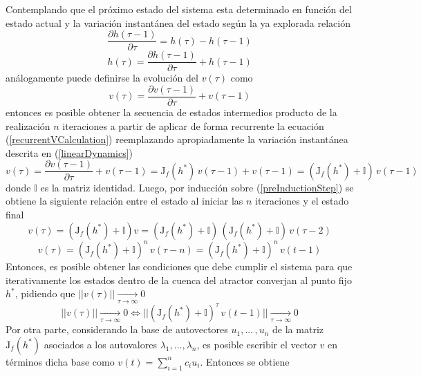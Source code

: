 \documentclass{article}
\begin{document}
	Contemplando que el próximo estado del sistema esta determinado en función del estado actual y la variación instantánea del estado según la ya explorada relación
	\begin{equation*}
	\dfrac{\partial h(\tau -1)}{\partial \tau} = h(\tau) - h(\tau -1)
	\end{equation*}
	\begin{equation}\label{recurrentStateCalculation}
	h(\tau) = \dfrac{\partial h(\tau -1)}{\partial \tau} + h(\tau -1)
	\end{equation}
	análogamente puede definirse la evolución del $v(\tau)$ como 
	\begin{equation}\label{recurrentVCalculation}
	v(\tau) = \dfrac{\partial v(\tau -1)}{\partial \tau} + v(\tau -1)
	\end{equation}
	entonces es posible obtener la secuencia de estados intermedios producto de la realización $n$ iteraciones a partir de aplicar de forma recurrente la ecuación (\ref{recurrentVCalculation}) reemplazando apropiadamente la variación instantánea descrita en (\ref{linearDynamics})
	\begin{equation}\label{preInductionStep}
	v(\tau) = \dfrac{\partial v(\tau -1)}{\partial \tau} + v(\tau -1) = \mathrm{J}_f(h^*) \, v(\tau -1) + v(\tau -1) = (\mathrm{J}_f(h^*) + \mathbb{I}) \, v(\tau -1)
	\end{equation}
	donde $\mathbb{I}$ es la matriz identidad. Luego, por inducción sobre (\ref{preInductionStep}) se obtiene la siguiente relación entre el estado al iniciar las $n$ iteraciones y el estado final
	\begin{equation*}
	v(\tau) = (\mathrm{J}_f(h^*) + \mathbb{I}) v = (\mathrm{J}_f(h^*) + \mathbb{I}) \, (\mathrm{J}_f(h^*) + \mathbb{I})  \, v(\tau-2)
	\end{equation*}
	\begin{equation*}
	v(\tau) = (\mathrm{J}_f(h^*) + \mathbb{I})^n \, v(\tau-n) = (\mathrm{J}_f(h^*) + \mathbb{I})^n \, v(t-1)
	\end{equation*}
	Entonces, es posible obtener las condiciones que debe cumplir el sistema para que iterativamente los estados dentro de la cuenca del atractor converjan al punto fijo $h^*$, pidiendo que $||v(\tau)||\xrightarrow[\tau \to \infty]{} 0$
	\begin{equation*}
	||v(\tau)|| \xrightarrow[\tau \to \infty]{} 0 \iff ||(\mathrm{J}_f(h^*) + \mathbb{I})^\tau \, v(t-1)|| \xrightarrow[\tau \to \infty]{} 0
	\end{equation*}
	Por otra parte, considerando la base de autovectores ${ u_1, ... \,, u_n }$ de la matriz $\mathrm{J}_f(h^*)$ asociados a los autovalores $\lambda_1, ... , \lambda_n$, es posible escribir el vector $v$ en términos dicha base como $v(t) = \sum_{i=1}^{n} c_i u_i$. Entonces se obtiene
\end{document}
